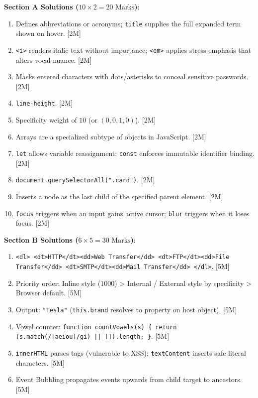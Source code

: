 \begin{solutionbox}
\noindent\textbf{Section A Solutions ($10 \times 2 = 20\text{ Marks}$)}:
\begin{enumerate}
    \item Defines abbreviations or acronyms; \texttt{title} supplies the full expanded term shown on hover. [2M]
    \item \texttt{<i>} renders italic text without importance; \texttt{<em>} applies stress emphasis that alters vocal nuance. [2M]
    \item Masks entered characters with dots/asterisks to conceal sensitive passwords. [2M]
    \item \texttt{line-height}. [2M]
    \item Specificity weight of $10$ (or $(0, 0, 1, 0)$). [2M]
    \item Arrays are a specialized subtype of objects in JavaScript. [2M]
    \item \texttt{let} allows variable reassignment; \texttt{const} enforces immutable identifier binding. [2M]
    \item \texttt{document.querySelectorAll(".card")}. [2M]
    \item Inserts a node as the last child of the specified parent element. [2M]
    \item \texttt{focus} triggers when an input gains active cursor; \texttt{blur} triggers when it loses focus. [2M]
\end{enumerate}

\medskip
\noindent\textbf{Section B Solutions ($6 \times 5 = 30\text{ Marks}$)}:
\begin{enumerate}[start=11]
    \item \texttt{<dl> <dt>HTTP</dt><dd>Web Transfer</dd> <dt>FTP</dt><dd>File Transfer</dd> <dt>SMTP</dt><dd>Mail Transfer</dd> </dl>}. [5M]
    \item Priority order: Inline style ($1000$) > Internal / External style by specificity > Browser default. [5M]
    \item Output: \texttt{"Tesla"} (\texttt{this.brand} resolves to property on host object). [5M]
    \item Vowel counter: \texttt{function countVowels(s) \{ return (s.match(/[aeiou]/gi) || []).length; \}}. [5M]
    \item \texttt{innerHTML} parses tags (vulnerable to XSS); \texttt{textContent} inserts safe literal characters. [5M]
    \item Event Bubbling propagates events upwards from child target to ancestors. [5M]
\end{enumerate}


\end{solutionbox}
